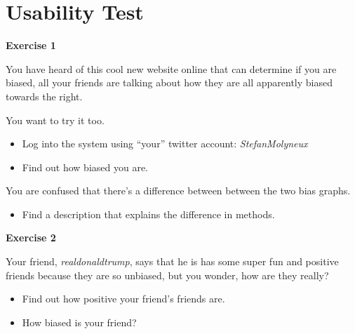 \chapter{Usability Test}

\textbf{Exercise 1}\nl

You have heard of this cool new website online that can determine if you are
biased, all your friends are talking about how they are all apparently biased
towards the right.\nl

You want to try it too.

\begin{itemize}
  \item Log into the system using “your” twitter account:
  \textit{StefanMolyneux}
  \item Find out how biased you are.
\end{itemize}

You are confused that there’s a difference between between the two bias graphs.

\begin{itemize}
  \item Find a description that explains the difference in methods.
\end{itemize}

\textbf{Exercise 2}\nl

Your friend, \textit{realdonaldtrump}, says that he is has some super fun and
positive friends because they are so unbiased, but you wonder, how are they
really?


\begin{itemize}
  \item Find out how positive your friend’s friends are.
  \item How biased is your friend?
\end{itemize}
